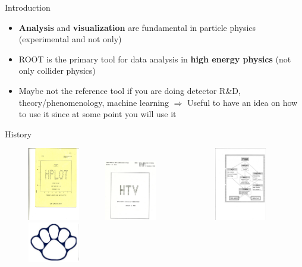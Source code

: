 \documentclass[aspectratio=169]{beamer}
\begin{document}
\begin{frame}{Introduction}
\begin{itemize}
    \item \textbf{Analysis} and \textbf{visualization} are fundamental in particle physics (experimental and not only)
\item ROOT is the primary tool for data analysis in \textbf{high energy physics} (not only collider physics)
\item Maybe not the reference tool if you are doing detector R\&D, theory/phenomenology, machine learning $\Rightarrow$ Useful to have an idea on how to use it since at some point you will use it
\end{itemize}
\end{frame}

\begin{frame}{History}
    \begin{figure}
        \includegraphics[width=0.2\textwidth]{hplot.png}
        ~~~~~
        \includegraphics[width=0.2\textwidth]{htv.png}
        ~~~~~~~~~~~~~
        \includegraphics[width=0.2\textwidth]{paw-2.png}
        \includegraphics[width=0.2\textwidth]{paw-1.png}


\end{figure}
\end{frame}
\end{document}
